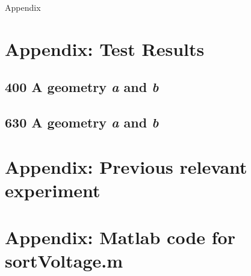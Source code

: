 \documentclass[10pt,a4paper,twoside]{article}
\begin{document}
\cleardoublepage
\appendix
\vspace*{\fill}
\begingroup
\begin{center}
\huge Appendix
\end{center}
\endgroup
\vspace*{\fill}
\cleardoublepage
\section{Appendix: Test Results} \label{app:rawData}
\setcounter{figure}{0}
\makeatletter 
\renewcommand{\thefigure}{A.\@arabic\c@figure}
\makeatother

\setcounter{table}{0}
\makeatletter 
\renewcommand{\thetable}{A.\@arabic\c@table}
\makeatother

\subsection{400 A geometry \textit{a} and \textit{b}} \label{app:testResults400A} 

\subsection{630 A geometry \textit{a} and \textit{b}} \label{app:testResults630A}

\newpage



\cleardoublepage
\section{Appendix: Previous relevant experiment} \label{app:PrevReleEx}
\makeatletter 
\renewcommand{\thefigure}{B.\@arabic\c@figure}
\makeatother

\makeatletter 
\renewcommand{\thetable}{B.\@arabic\c@table}
\makeatother

\section{Appendix: Matlab code for sortVoltage.m} %

\end{document}
